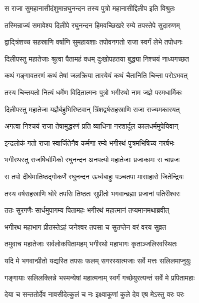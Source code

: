 \twolineshloka
{स राजा सुमहानासीदंशुमान्रघुनन्दन}
{तस्य पुत्रो महानासीद्दिलीप इति विश्रुतः} %

\twolineshloka
{तस्मिन्राज्यं समावेश्य दिलीपे रघुनन्दन}
{हिमवच्छिखरे रम्ये तपस्तेपे सुदारुणम्} %

\twolineshloka
{द्वाद्त्रिंशच्च सहस्राणि वर्षाणि सुमहायशाः}
{तपोवनगतो राजा स्वर्गं लेभे तपोधनः} %

\twolineshloka
{दिलीपस्तु महातेजाः श्रुत्वा पैतामहं वधम्}
{दुःखोपहतया बुद्ध्या निश्चयं नाध्यगच्छत} %

\twolineshloka
{कथं गङ्गावतरणं कथं तेषां जलक्रिया}
{तारयेयं कथं चैतानिति चिन्ता परोऽभवत्} %

\twolineshloka
{तस्य चिन्तयतो नित्यं धर्मेण विदितात्मनः}
{पुत्रो भगीरथो नाम जज्ञे परमधार्मिकः} %

\twolineshloka
{दिलीपस्तु महातेजा यज्ञैर्बहुभिरिष्टवान्}
{त्रिंशद्वर्षसहस्राणि राजा राज्यमकारयत्} %

\twolineshloka
{अगत्वा निश्चयं राजा तेषामुद्धरणं प्रति}
{व्याधिना नरशार्दूल कालधर्ममुपेयिवान्} %

\twolineshloka
{इन्द्रलोकं गतो राजा स्वार्जितेनैव कर्मणा}
{रम्ये भगीरथं पुत्रमभिषिच्य नरर्षभः} %

\twolineshloka
{भगीरथस्तु राजर्षिर्धार्मिको रघुनन्दन}
{अनपत्यो महातेजाः प्रजाकामः स चाप्रजः} %

\twolineshloka
{स तपो दीर्घमातिष्ठद्गोकर्णे रघुनन्दन}
{ऊर्ध्वबाहुः पञ्चतपा मासाहारो जितेन्द्रियः} %

\twolineshloka
{तस्य वर्षसहस्राणि घोरे तपसि तिष्ठतः}
{सुप्रीतो भगवान्ब्रह्मा प्रजानां पतिरीश्वरः} %

\twolineshloka
{ततः सुरगणैः सार्धमुपागम्य पितामहः}
{भगीरथं महात्मानं तप्यमानमथाब्रवीत्} %

\twolineshloka
{भगीरथ महाभाग प्रीतस्तेऽहं जनेश्वर}
{तपसा च सुतप्तेन वरं वरय सुव्रत} %

\twolineshloka
{तमुवाच महातेजाः सर्वलोकपितामहम्}
{भगीरथो महाभागः कृताञ्जलिरवस्थितः} %

\twolineshloka
{यदि मे भगवान्प्रीतो यद्यस्ति तपसः फलम्}
{सगरस्यात्मजाः सर्वे मत्तः सलिलमाप्नुयुः} %

\twolineshloka
{गङ्गायाः सलिलक्लिन्ने भस्मन्येषां महात्मनाम्}
{स्वर्गं गच्छेयुरत्यन्तं सर्वे मे प्रपितामहाः} %

\twolineshloka
{देया च सन्ततोर्देव नावसीदेत्कुलं च नः}
{इक्ष्वाकूणां कुले देव एष मेऽस्तु वरः परः} %

